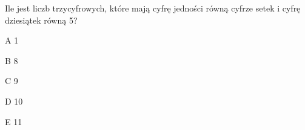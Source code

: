 \begin{tresc}
Ile jest liczb trzycyfrowych, które mają cyfrę jedności równą cyfrze setek i cyfrę dziesiątek równą 5?
\end{tresc}
\begin{wariant}{A} 1 \end{wariant}
\begin{wariant}{B} 8 \end{wariant}
\begin{wariant}{C} 9 \end{wariant}
\begin{wariant}{D} 10 \end{wariant}
\begin{wariant}{E} 11 \end{wariant}
